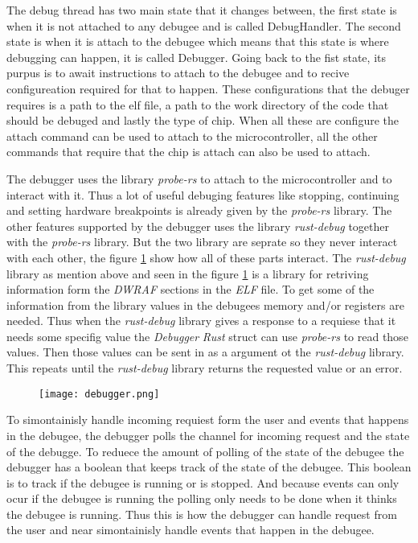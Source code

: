
The debug thread has two main state that it changes between, the first state is when it is not attached to any debugee and is called DebugHandler.
The second state is when it is attach to the debugee which means that this state is where debugging can happen, it is called Debugger.
Going back to the fist state, its purpus is to await instructions to attach to the debugee and to recive configureation required for that to happen.
These configurations that the debuger requires is a path to the elf file, a path to the work directory of the code that should be debuged and lastly the type of chip.
When all these are configure the attach command can be used to attach to the microcontroller, all the other commands that require that the chip is attach can also be used to attach.


The debugger uses the library \emph{probe-rs} to attach to the microcontroller and to interact with it.
Thus a lot of useful debuging features like stopping, continuing and setting hardware breakpoints is already given by the \emph{probe-rs} library.
The other features supported by the debugger uses the library \emph{rust-debug} together with the \emph{probe-rs} library.
But the two library are seprate so they never interact with each other, the figure \ref{fig:debugger} show how all of these parts interact.
The \emph{rust-debug} library as mention above and seen in the figure \ref{fig:debugger} is a library for retriving information form the \emph{DWRAF} sections in the \emph{ELF} file.
To get some of the information from the library values in the debugees memory and/or registers are needed.
Thus when the \emph{rust-debug} library gives a response to a requiese that it needs some specifig value the \emph{Debugger} \emph{Rust} struct can use \emph{probe-rs} to read those values.
Then those values can be sent in as a argument ot the \emph{rust-debug} library.
This repeats until the \emph{rust-debug} library returns the requested value or an error.


\begin{figure}[h]
    \centering
    \texttt{[image: debugger.png]}
    \label{fig:debugger}
\end{figure}


To simontainisly handle incoming requiest form the user and events that happens in the debugee, the debugger polls the channel for incoming request and the state of the debugge.
To reduece the amount of polling of the state of the debugee the debugger has a boolean that keeps track of the state of the debugee.
This boolean is to track if the debugee is running or is stopped.
And because events can only ocur if the debugee is running the polling only needs to be done when it thinks the debugee is running.
Thus this is how the debugger can handle request from the user and near simontainisly handle events that happen in the debugee.


